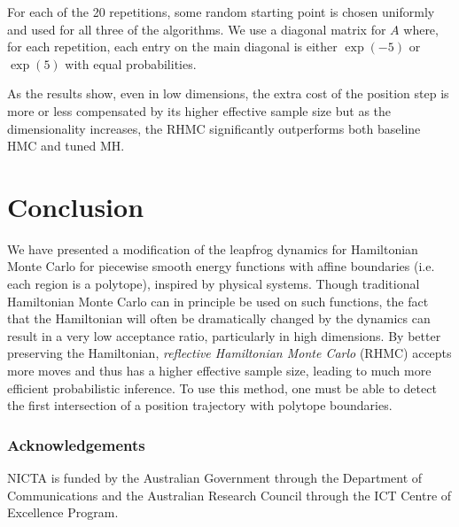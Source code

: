 \documentclass{article} %
\begin{document}
For each of the 20 repetitions, some random starting point is chosen uniformly and used for all three of the algorithms.  We use a diagonal matrix for $A$ where, for each repetition, each entry on the main diagonal is either $\exp(-5)$ or $\exp(5)$ with equal probabilities.

As the results show, even in low dimensions, the extra cost of the position step is more or less compensated by its higher effective sample size but as the dimensionality increases, the RHMC significantly outperforms both baseline HMC and tuned MH.

\section{Conclusion}

We have presented a modification of the leapfrog dynamics for Hamiltonian Monte Carlo for piecewise smooth energy functions with affine boundaries (i.e. each region is a polytope), inspired by physical systems.  Though traditional Hamiltonian Monte Carlo can in principle be used on such functions, the fact that the Hamiltonian will often be dramatically changed by the dynamics can result in a very low acceptance ratio, particularly in high dimensions.  By better preserving the Hamiltonian, \emph{reflective Hamiltonian Monte Carlo} (RHMC) accepts more moves and thus has a higher effective sample size, leading to much more efficient probabilistic inference.  To use this method, one must be able to detect the first intersection of a position trajectory with polytope boundaries.


\subsubsection*{Acknowledgements}
NICTA is funded by the Australian Government through the Department of Communications and the Australian Research Council through the ICT Centre of Excellence Program.







\end{document}
